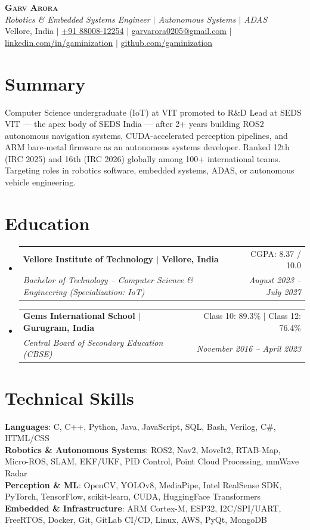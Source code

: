 \documentclass[letterpaper,10pt]{article}
\makeatletter
\newcommand{\resumeSubheading}[4]{
  \vspace{-2pt}\item
    \begin{tabular*}{0.97\textwidth}[t]{l@{\extracolsep{\fill}}r}
      \textbf{#1} & #2 \\
      \textit{\small#3} & \textit{\small #4} \\
    \end{tabular*}\vspace{-7pt}
}
\newcommand{\resumeSubHeadingListStart}{\begin{itemize}[leftmargin=0.15in, label={}]}
\newcommand{\resumeSubHeadingListEnd}{\end{itemize}}
\makeatother
\begin{document}
\begin{center}
    \textbf{\Huge \scshape Garv Arora} \\ \vspace{3pt}
    \small\textit{Robotics \& Embedded Systems Engineer $|$ Autonomous Systems $|$ ADAS} \\ \vspace{3pt}
    \small Vellore, India $|$
    \href{tel:+918800812254}{+91 88008-12254} $|$
    \href{mailto:garvarora0205@gmail.com}{garvarora0205@gmail.com} $|$
    \href{https://linkedin.com/in/gaminization}{linkedin.com/in/gaminization} $|$
    \href{https://github.com/gaminization}{github.com/gaminization}
\end{center}

\section{Summary}
\small{Computer Science undergraduate (IoT) at VIT promoted to R\&D Lead at SEDS VIT --- the apex body of SEDS India --- after 2+ years building ROS2 autonomous navigation systems, CUDA-accelerated perception pipelines, and ARM bare-metal firmware as an autonomous systems developer. Ranked 12th (IRC 2025) and 16th (IRC 2026) globally among 100+ international teams. Targeting roles in robotics software, embedded systems, ADAS, or autonomous vehicle engineering.}

\section{Education}
  \resumeSubHeadingListStart
    \resumeSubheading
      {Vellore Institute of Technology $|$ Vellore, India}{CGPA: 8.37 / 10.0}
      {Bachelor of Technology -- Computer Science \& Engineering (Specialization: IoT)}{August 2023 -- July 2027}
    \resumeSubheading
      {Gems International School $|$ Gurugram, India}{Class 10: 89.3\% $|$ Class 12: 76.4\%}
      {Central Board of Secondary Education (CBSE)}{November 2016 -- April 2023}
  \resumeSubHeadingListEnd

\section{Technical Skills}
\begin{itemize}[leftmargin=0.15in, label={}]
  \small{\item{
    \textbf{Languages}{: C, C++, Python, Java, JavaScript, SQL, Bash, Verilog, C\#, HTML/CSS} \\
    \textbf{Robotics \& Autonomous Systems}{: ROS2, Nav2, MoveIt2, RTAB-Map, Micro-ROS, SLAM, EKF/UKF, PID Control, Point Cloud Processing, mmWave Radar} \\
    \textbf{Perception \& ML}{: OpenCV, YOLOv8, MediaPipe, Intel RealSense SDK, PyTorch, TensorFlow, scikit-learn, CUDA, HuggingFace Transformers} \\
    \textbf{Embedded \& Infrastructure}{: ARM Cortex-M, ESP32, I2C/SPI/UART, FreeRTOS, Docker, Git, GitLab CI/CD, Linux, AWS, PyQt, MongoDB}
  }}
\end{itemize}
\end{document}
